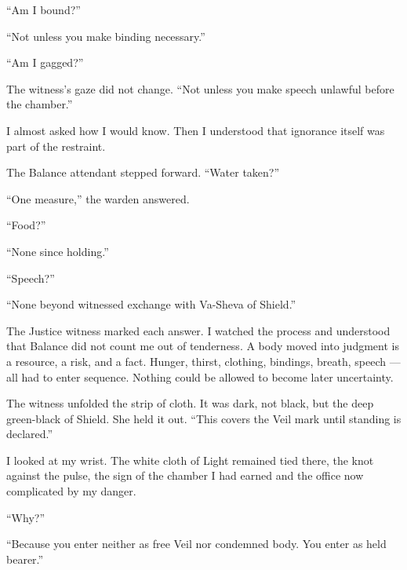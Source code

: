 ``Am I bound?''\par

``Not unless you make binding necessary.''\par

``Am I gagged?''\par

The witness's gaze did not change. ``Not unless you make speech unlawful before the chamber.''\par

I almost asked how I would know. Then I understood that ignorance itself was part of the restraint.\par

The Balance attendant stepped forward. ``Water taken?''\par

``One measure,'' the warden answered.\par

``Food?''\par

``None since holding.''\par

``Speech?''\par

``None beyond witnessed exchange with Va-Sheva of Shield.''\par

The Justice witness marked each answer. I watched the process and understood that Balance did not count me out of tenderness. A body moved into judgment is a resource, a risk, and a fact. Hunger, thirst, clothing, bindings, breath, speech --- all had to enter sequence. Nothing could be allowed to become later uncertainty.\par

The witness unfolded the strip of cloth. It was dark, not black, but the deep green-black of Shield. She held it out. ``This covers the Veil mark until standing is declared.''\par

I looked at my wrist. The white cloth of Light remained tied there, the knot against the pulse, the sign of the chamber I had earned and the office now complicated by my danger.\par

``Why?''\par

``Because you enter neither as free Veil nor condemned body. You enter as held bearer.''\par

